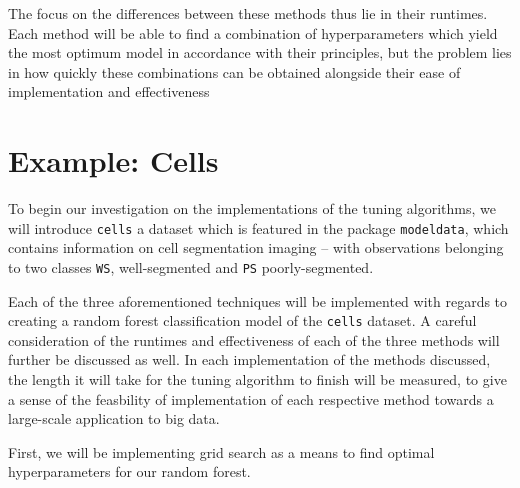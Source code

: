 \documentclass[12pt]{article}
\begin{document}
The focus on the differences between these methods thus lie in their
runtimes. Each method will be able to find a combination of
hyperparameters which yield the most optimum model in accordance with
their principles, but the problem lies in how quickly these combinations
can be obtained alongside their ease of implementation and effectiveness
\citep{Probst2019}

\newpage

\hypertarget{example-cells}{%
\section{Example: Cells}\label{example-cells}}

\label{sec:cells}

To begin our investigation on the implementations of the tuning
algorithms, we will introduce \texttt{cells} a dataset which is featured
in the package \texttt{modeldata}, which contains information on cell
segmentation imaging -- with observations belonging to two classes
\texttt{WS}, well-segmented and \texttt{PS} poorly-segmented.

Each of the three aforementioned techniques will be implemented with
regards to creating a random forest classification model of the
\texttt{cells} dataset. A careful consideration of the runtimes and
effectiveness of each of the three methods will further be discussed as
well. In each implementation of the methods discussed, the length it
will take for the tuning algorithm to finish will be measured, to give a
sense of the feasbility of implementation of each respective method
towards a large-scale application to big data.

First, we will be implementing grid search as a means to find optimal
hyperparameters for our random forest.
\end{document}
